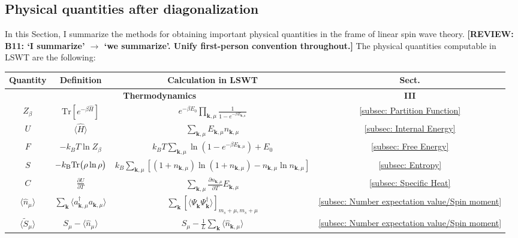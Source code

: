 \documentclass[aps, prx, nofootinbib, superscriptaddress]{revtex4-2}
\newcommand{\REVIEW}[1]{{\color{reviewcolor}\bfseries [REVIEW: #1]}}
\newcommand{\kvec}{\mathbf{k}}
\newcommand{\Tr}{\mathrm{Tr}}
\begin{document}
\subsection{Physical quantities after diagonalization}

In this Section, I summarize the methods for obtaining important physical quantities in the frame of linear spin wave theory.
\REVIEW{B11: `I summarize' $\to$ `we summarize'. Unify first-person convention throughout.}
The physical quantities computable in LSWT are the following:


\begin{table}[!h]
    \centering
    \begin{tabular}{c|c|c|c}
    \hline\hline
    \textbf{Quantity} & \textbf{Definition} & \textbf{Calculation in LSWT} & \textbf{Sect.} \\
    \hline
    \multicolumn{3}{c|}{\textbf{Thermodynamics}} & \textbf{III} \\[0.5ex]
    \hline
    $Z_{\beta}$ %
    & 
    $\text{Tr} [e^{-\beta \hat{H}}]$ 
    & $e^{-\beta E_{0}} \prod_{\kvec, \mu} \frac{1}{1 - e^{-\beta E_{\kvec, \mu}}}$ 
    & \ref{subsec: Partition Function}
    \\[1ex]
    $U$ 
    & $\langle \hat{H} \rangle$ & $\sum_{\kvec, \mu} E_{\kvec, \mu} n_{\kvec, \mu}$
    & \ref{subsec: Internal Energy}
    \\[1ex]
    $F$ 
    & $- k_B T \ln Z_{\beta}$ 
    & $  k_B T \sum_{\kvec, \mu} \ln \left( 1 - e^{-\beta E_{\kvec, \mu}} \right) + E_{0} $ 
    & \ref{subsec: Free Energy}
    \\[1ex]
    $S$ 
    & $-k_{\rm B}\Tr \big( \rho \ln \rho \big)$
    & $k_B \sum_{\kvec, \mu} \left[ (1 + n_{\kvec, \mu}) \ln (1 + n_{\kvec, \mu}) - n_{\kvec, \mu} \ln n_{\kvec, \mu} \right]$ 
    & \ref{subsec: Entropy}
    \\[1ex]
    $C$ 
    & $\frac{\partial U}{\partial T}$ 
    & $\sum_{\kvec, \mu} \frac{\partial n_{\kvec, \mu}}{\partial T} E_{\kvec, \mu}$ 
    & \ref{subsec: Specific Heat} 
    \\[1ex]
    $\langle \hat{n}_\mu \rangle$ 
    & $\sum_{\kvec} \langle a^{\dagger}_{\kvec, \mu} a_{\kvec, \mu} \rangle$  
    & $\sum_{\kvec} [\langle \Psi_{\kvec}^{\phantom\dagger} \Psi_{\kvec}^{\dagger} \rangle]_{m_{s} + \mu, m_{s} + \mu}$ 
    & \ref{subsec: Number expectation value/Spin moment} \\
    [1ex]
    $\langle \widetilde{S}_\mu \rangle$ 
    & $S_{\mu} - \langle \hat{n}_\mu \rangle$  
    & $S_{\mu} - \frac{1}{L} \sum_{\kvec} \langle \hat{n}_{\kvec, \mu} \rangle$ & \ref{subsec: Number expectation value/Spin moment} \\

\end{tabular}
\end{table}
\end{document}
